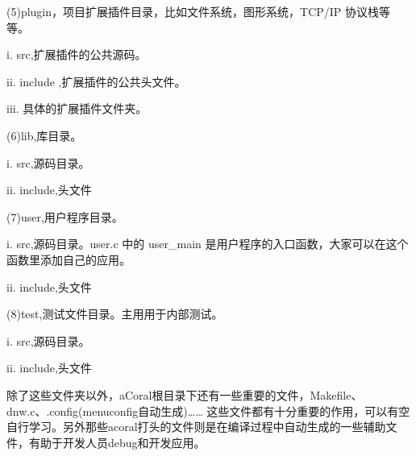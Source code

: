 (5)plugin，项目扩展插件目录，比如文件系统，图形系统，TCP/IP 协议栈等等。

	\chinesespace i. src,扩展插件的公共源码。

	\chinesespace ii. include ,扩展插件的公共头文件。

	\chinesespace iii. 具体的扩展插件文件夹。

(6)lib,库目录。

	\chinesespace i. src,源码目录。

	\chinesespace ii. include,头文件

(7)user,用户程序目录。

	\chinesespace i. src,源码目录。user.c 中的 user\_main 是用户程序的入口函数，大家可以在这个函数里添加自己的应用。

	\chinesespace ii. include,头文件

(8)test,测试文件目录。主用用于内部测试。

	\chinesespace i. src,源码目录。

	\chinesespace ii. include,头文件

除了这些文件夹以外，aCoral根目录下还有一些重要的文件，Makefile、dnw.c、.config(menuconfig自动生成)……
这些文件都有十分重要的作用，可以有空自行学习。另外那些acoral打头的文件则是在编译过程中自动生成的一些辅助文件，有助于开发人员debug和开发应用。

